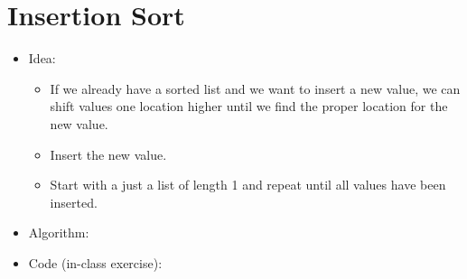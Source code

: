 \documentclass[letterpaper,10pt,english]{sphinxmanual}
\begin{document}
\section{Insertion Sort}
\label{\detokenize{lecture_notes/lec21_sorting:insertion-sort}}\begin{itemize}
\item {} 
Idea:
\begin{itemize}
\item {} 
If we already have a sorted list and we want to insert a new
value, we can shift values one location higher until we find the
proper location for the new value.

\item {} 
Insert the new value.

\item {} 
Start with a just a list of length 1 and repeat until all values
have been inserted.

\end{itemize}

\item {} 
Algorithm:

\begin{sphinxVerbatim}[commandchars=\\\{\}]
          
             
        
                  
                 
         
            
\end{sphinxVerbatim}

\item {} 
Code (in-class exercise):

\begin{sphinxVerbatim}[commandchars=\\\{\}]
 
\end{sphinxVerbatim}

\end{itemize}
\end{document}
